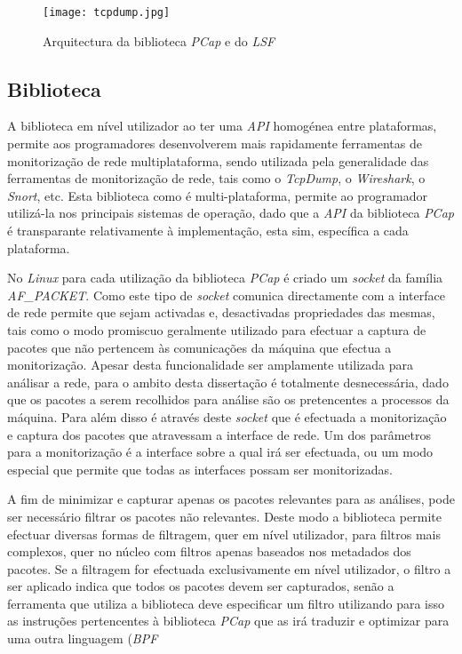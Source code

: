 \begin{figure}[htbp]
       \centering
       \texttt{[image: tcpdump.jpg]}
       \caption{Arquitectura da biblioteca \textit{PCap} e do \textit{LSF}}
      \label{fig:pcap_architecture2}
\end{figure}

\subsection{Biblioteca}

A biblioteca em nível utilizador ao ter uma \textit{API} homogénea entre plataformas, permite aos programadores desenvolverem mais rapidamente ferramentas de monitorização de rede multiplataforma, sendo utilizada pela generalidade das ferramentas de monitorização de rede, tais como o \textit{TcpDump}, o \textit{Wireshark}, o \textit{Snort}, etc.
Esta biblioteca como é multi-plataforma, permite ao programador utilizá-la nos principais sistemas de operação, dado que a \textit{API} da biblioteca \textit{PCap} é transparante relativamente à implementação, esta sim, específica a cada plataforma.

No \textit{Linux} para cada utilização da biblioteca \textit{PCap} é criado um \textit{socket} da família \textit{AF\_PACKET}.
Como este tipo de \textit{socket} comunica directamente com a interface de rede permite que sejam activadas e, desactivadas propriedades das mesmas, tais como o modo promiscuo geralmente utilizado para efectuar a captura de pacotes que não pertencem às comunicações da máquina que efectua a monitorização.
Apesar desta funcionalidade ser amplamente utilizada para análisar a rede, para o ambito desta dissertação é totalmente desnecessária, dado que os pacotes a serem recolhidos para análise são os pretencentes a processos da máquina.
Para além disso é através deste \textit{socket} que é efectuada a monitorização e captura dos pacotes que atravessam a interface de rede.
Um dos parâmetros para a monitorização é a interface sobre a qual irá ser efectuada, ou um modo especial que permite que todas as interfaces possam ser monitorizadas.

A fim de minimizar e capturar apenas os pacotes relevantes para as análises, pode ser necessário filtrar os pacotes não relevantes.
Deste modo a biblioteca permite efectuar diversas formas de filtragem, quer em nível utilizador, para filtros mais complexos, quer no núcleo com filtros apenas baseados nos metadados dos pacotes.
Se a filtragem for efectuada exclusivamente em nível utilizador, o filtro a ser aplicado indica que todos os pacotes devem ser capturados, senão a ferramenta que utiliza a biblioteca deve especificar um filtro utilizando para isso as instruções pertencentes à biblioteca \textit{PCap} que as irá traduzir e optimizar para uma outra linguagem (\textit{BPF}
 


